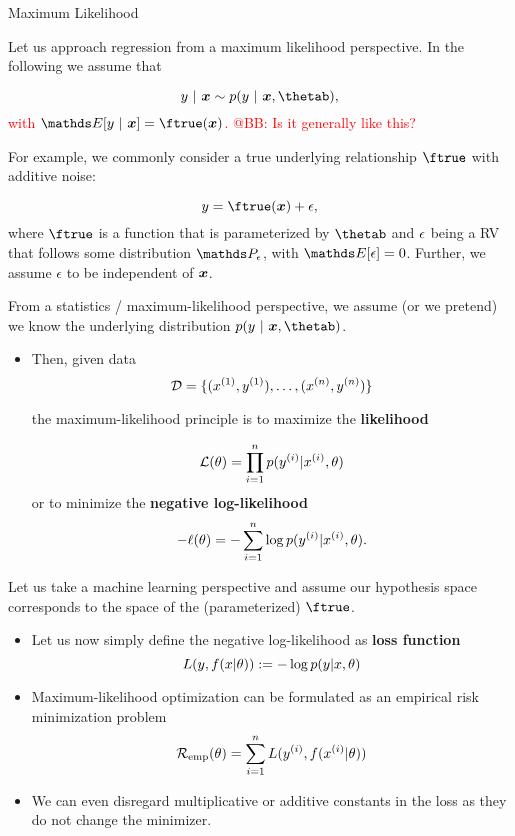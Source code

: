\begin{vbframe}{Maximum Likelihood}

Let us approach regression from a maximum likelihood perspective. In the following we assume that 

$$
	y~|~ \xv \sim p(y~|~\xv, \thetab), 
$$
\textcolor{red}{with $\E[y ~|~\xv] = \ftrue(\xv)$. @BB: Is it generally like this? } 

\lz 

For example, we commonly consider a true underlying relationship $\ftrue$ with additive noise: 

$$
y = \ftrue(\xv) + \eps,
$$
where $\ftrue$ is a function that is parameterized by $\thetab$ and $\epsilon$ being a RV that follows some distribution $\P_\eps$, with $\E[\eps] = 0$. Further, we assume $\epsilon$ to be independent of $\bm{x}$. 


\framebreak 

From a statistics / maximum-likelihood perspective, we assume (or we pretend) we know the underlying distribution $p(y~|~\xv, \thetab)$. 

\begin{itemize}
\item Then, given data 
$$
\mathcal{D} = \{ (x^{(1)}, y^{(1)}), \ldots, (x^{(n)}, y^{(n)})\}
$$ 

the maximum-likelihood principle is to maximize the \textbf{likelihood}

$$ \mathcal{L}(\theta) = \prod_{i=1}^n p(y^{(i)} |x^{(i)}, \theta) $$
or to minimize the \textbf{negative log-likelihood}
$$ -\ell(\theta) = -\sum_{i=1}^n \log p(y^{(i)} |x^{(i)}, \theta). $$
\end{itemize}


\framebreak 

Let us take a machine learning perspective and assume our hypothesis space corresponds to the space of the (parameterized) $\ftrue$. 

\begin{itemize}
\item Let us now simply define the negative log-likelihood as \textbf{loss function} 
$$ L(y, f(x | \theta)) := - \log p(y |x, \theta) $$
\item Maximum-likelihood optimization can be formulated as an empirical risk minimization problem
$$\mathcal{R}_{\text{emp}}(\theta) = \sum_{i=1}^n L(y^{(i)}, f(x^{(i)} | \theta))$$

\item We can even disregard multiplicative or additive constants in the loss as they do not change the minimizer.


\end{itemize}
\end{vbframe}
